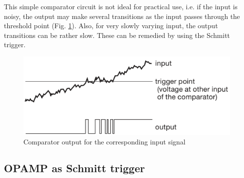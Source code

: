 This simple comparator circuit is not ideal for practical use, i.e. if the input is noisy, the output may make several transitions as the input passes through the threshold point (Fig. \ref{comp3}). Also, for very slowly varying input, the output transitions can be rather slow. These can be remedied by using the Schmitt trigger.

\begin{figure}[H]
    \centering
    \includegraphics[width=0.85\columnwidth]{images/comp3.png}
    \caption{Comparator output for the corresponding input signal}
    \label{comp3}
\end{figure}




\subsection{OPAMP as Schmitt trigger}

